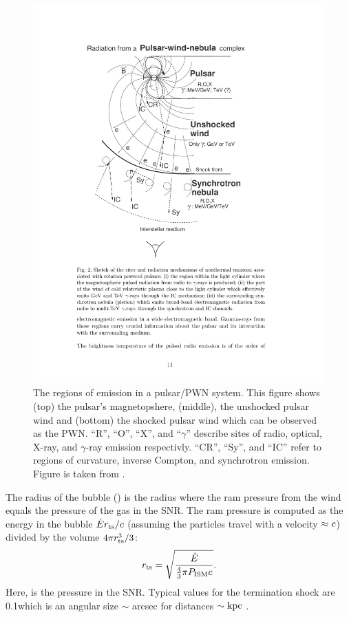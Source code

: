 \begin{figure}[htbp]
  \centering
    \includegraphics{chapters/pulsar_pwn_system/figures/termination_shock.pdf}
  \caption{The regions of emission in a pulsar/\ac{PWN} system. 
  This figure shows (top) the pulsar's magnetopshere, (middle), the
  unshocked pulsar wind and (bottom) the shocked pulsar wind which can
  be observed as the \ac{PWN}.
  ``R'', ``O'', ``X'', and ``$\gamma$'' describe sites of radio, optical, X-ray, and
  $\gamma$-ray emission respectivly.
  ``CR'', ``Sy'', and ``IC'' refer to regions of curvature, inverse Compton, and
  synchrotron emission.
  Figure is taken from \cite{aharonian_2003_exploring-physics}.
  }
\end{figure}

The radius of the bubble (\radiusterminationshock) is the radius
where the ram pressure from the wind equals the pressure of the gas
in the \ac{SNR}.  The ram pressure is computed as the energy in the
bubble $\dot{E} r_\text{ts}/c$ (assuming the particles
travel with a velocity $\approx c$) divided by the volume
$4\pi r_\text{ts}^3/3$:
\begin{equation}
  r_\text{ts} = \sqrt{\frac{\dot{E}}{\tfrac{4}{3}\pi P_\text{ISM} c}}.
\end{equation}
Here, \pressureISM is the pressure in the SNR.  Typical values
for the termination shock are 0.1\unitspace\parsec which is an
angular size $\sim$ \ac{arcsec} for distances $\sim\text{kpc}$
\citep{gaensler_2006_evolution-structure}.

